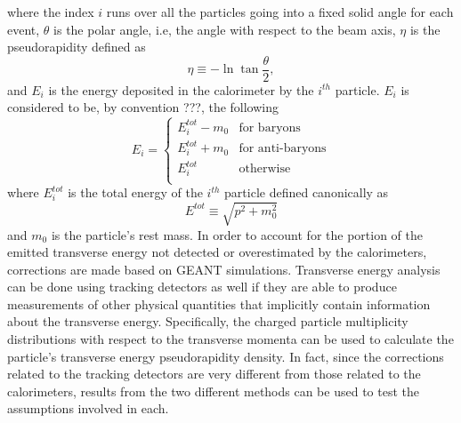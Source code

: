 where the index $i$ runs over all the particles going into a fixed solid angle for each event, $\theta$ is the polar angle, i.e, the angle with respect to the beam axis, $\eta$ is the pseudorapidity defined as 
\begin{equation}\label{eqn:pseudorap}
\eta\equiv-\ln\tan{\frac{\theta}{2}},
\end{equation}
and $E_{i}$ is the energy deposited in the calorimeter by the $i^{th}$ particle. $E_{i}$ is considered to be, by convention \cite{PhysRevC.89.044905}???, the following
\begin{equation}\label{eqn:EiCaseByCase}
E_{i} = 
	\begin{cases}
	E_{i}^{tot}-m_{0} & \text{for baryons} \\
	E_{i}^{tot}+m_{0} & \text{for anti-baryons} \\	
	E_{i}^{tot} & \text{otherwise} \\
	\end{cases}
\end{equation}
where $E_{i}^{tot}$ is the total energy of the $i^{th}$ particle defined canonically as
\begin{equation}\label{eqn:Etot}
E^{tot}\equiv\sqrt{p^{2}+m_{0}^2}
\end{equation}
and  $m_{0}$ is the particle's rest mass.
In order to account for the portion of the emitted transverse energy not detected or overestimated by the calorimeters, corrections are made based on GEANT simulations.%
Transverse energy analysis can be done using tracking detectors as well if they are able to produce measurements of other physical quantities that implicitly contain information about the transverse energy. Specifically, the charged particle multiplicity distributions with respect to the transverse momenta can be used to calculate the particle's transverse energy pseudorapidity density. In fact, since the corrections related to the tracking detectors are very different from those related to the calorimeters, results from the two different methods can be used to test the assumptions involved in each.

